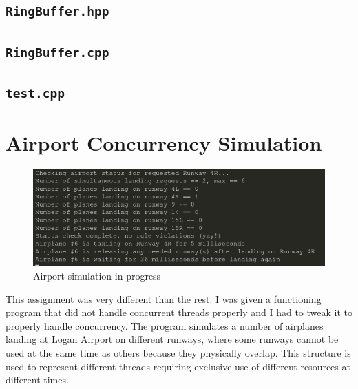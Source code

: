 \documentclass[12pt]{article}
\begin{document}


\subsection{\texttt{RingBuffer.hpp}}



\subsection{\texttt{RingBuffer.cpp}}



\subsection{\texttt{test.cpp}}
\label{section:guitar_test}




\newpage
\section{Airport Concurrency Simulation}

\begin{figure}

\includegraphics[scale=0.6]{../airport/Airport-Sync/simulation.png}
\centering
\caption{Airport simulation in progress}
\end{figure}

This assignment was very different than the rest. I was given a functioning program that did not handle concurrent threads properly and I had to tweak it to properly handle concurrency. The program simulates a number of airplanes landing at Logan Airport on different runways, where some runways cannot be used at the same time as others because they physically overlap. This structure is used to represent different threads requiring exclusive use of different resources at different times.
\end{document}
